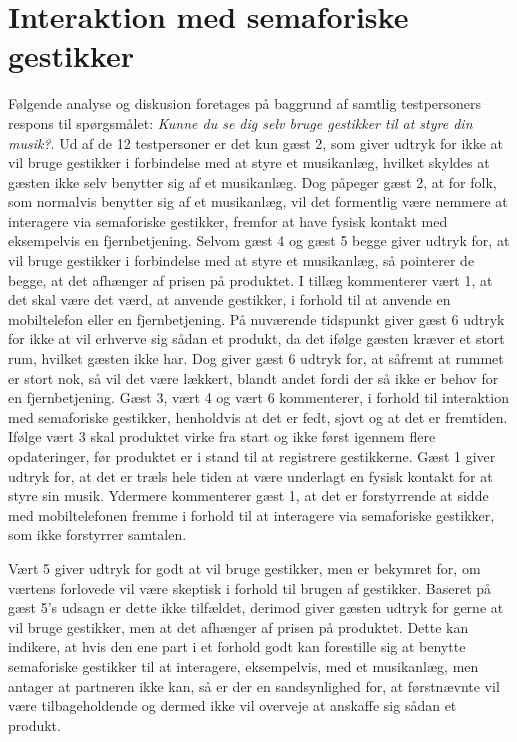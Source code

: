 \section{Interaktion med semaforiske gestikker}
\label{TestresultaterSocialAcceptBrug}
%
Følgende analyse og diskusion foretages på baggrund af samtlig testpersoners respons til spørgsmålet: \textit{Kunne du se dig selv bruge gestikker til at styre din musik?}. \blankline
%
Ud af de 12 testpersoner er det kun gæst 2, som giver udtryk for ikke at vil bruge gestikker i forbindelse med at styre et musikanlæg, hvilket skyldes at gæsten ikke selv benytter sig af et musikanlæg. Dog påpeger gæst 2, at for folk, som normalvis benytter sig af et musikanlæg, vil det formentlig være nemmere at interagere via semaforiske gestikker, fremfor at have fysisk kontakt med eksempelvis en fjernbetjening. Selvom gæst 4 og gæst 5 begge giver udtryk for, at vil bruge gestikker i forbindelse med at styre et musikanlæg, så pointerer de begge, at det afhænger af prisen på produktet. I tillæg kommenterer vært 1, at det skal være det værd, at anvende gestikker, i forhold til at anvende en mobiltelefon eller en fjernbetjening. På nuværende tidspunkt giver gæst 6 udtryk for ikke at vil erhverve sig sådan et produkt, da det ifølge gæsten kræver et stort rum, hvilket gæsten ikke har. Dog giver gæst 6 udtryk for, at såfremt at rummet er stort nok, så vil det være lækkert, blandt andet fordi der så ikke er behov for en fjernbetjening. Gæst 3, vært 4 og vært 6 kommenterer, i forhold til interaktion med semaforiske gestikker, henholdvis at det er fedt, sjovt og at det er fremtiden. Ifølge vært 3 skal produktet virke fra start og ikke først igennem flere opdateringer, før produktet er i stand til at registrere gestikkerne. Gæst 1 giver udtryk for, at det er træls hele tiden at være underlagt en fysisk kontakt for at styre sin musik. Ydermere kommenterer gæst 1, at det er forstyrrende at sidde med mobiltelefonen fremme i forhold til at interagere via semaforiske gestikker, som ikke forstyrrer samtalen.

Vært 5 giver udtryk for godt at vil bruge gestikker, men er bekymret for, om værtens forlovede vil være skeptisk i forhold til brugen af gestikker. Baseret på gæst 5's udsagn er dette ikke tilfældet, derimod giver gæsten udtryk for gerne at vil bruge gestikker, men at det afhænger af prisen på produktet. Dette kan indikere, at hvis den ene part i et forhold godt kan forestille sig at benytte semaforiske gestikker til at interagere, eksempelvis, med et musikanlæg, men antager at partneren ikke kan, så er der en sandsynlighed for, at førstnævnte vil være tilbageholdende og dermed ikke vil overveje at anskaffe sig sådan et produkt.    

